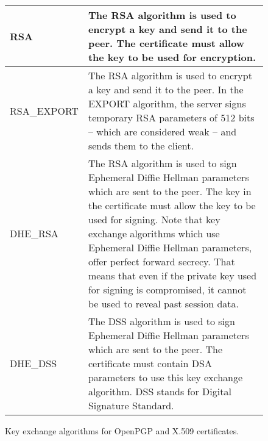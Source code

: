 \begin{figure}[hbtp]
\begin{tabular}{|l|p{9cm}|}
\hline
RSA & The RSA algorithm is used to encrypt a key and send it to the peer.
The certificate must allow the key to be used for encryption.
\\
\hline
RSA\_EXPORT & The RSA algorithm is used to encrypt a key and send it to the peer.
In the EXPORT algorithm, the server signs temporary RSA parameters of 512
bits -- which are considered weak -- and sends them to the client.
\\
\hline
DHE\_RSA & The RSA algorithm is used to sign Ephemeral Diffie Hellman
parameters which are sent to the peer. The key in the certificate must allow
the key to be used for signing. Note that key exchange algorithms which use
Ephemeral Diffie Hellman parameters, offer perfect forward secrecy. That means
that even if the private key used for signing is compromised, it cannot be
used to reveal past session data.
\\
\hline
DHE\_DSS & The DSS algorithm is used to sign Ephemeral Diffie Hellman
parameters which are sent to the peer. The certificate must contain DSA
parameters to use this key exchange algorithm. DSS stands for Digital Signature
Standard.
\\
\hline
\end{tabular}

\caption{Key exchange algorithms for OpenPGP and X.509 certificates.}
\label{fig:cert}

\end{figure}


